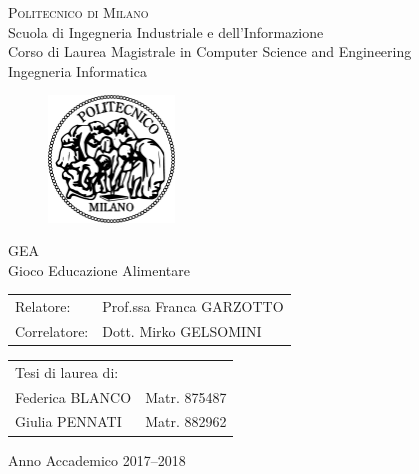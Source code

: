 \begin{titlepage}

\begin{center}
\Large{\textsc{Politecnico di Milano}}\\
\Large{Scuola di Ingegneria Industriale e dell'Informazione}\\
\large{Corso di Laurea Magistrale in Computer Science and Engineering}\\
\large{Ingegneria Informatica}
\par\end{center}

\vspace{0.5cm}

\begin{center}
\begin{figure}[h]
\centering{}\includegraphics[width=0.3\textwidth]{title-page/logo-polimi}
\end{figure}
\vspace{1cm}
\par\end{center}

\begin{center}
\LARGE{GEA\\
Gioco Educazione Alimentare}\vspace{2cm}
\par\end{center}

\begin{flushleft}
\begin{tabular}{ll}
Relatore:  & Prof.ssa Franca GARZOTTO\tabularnewline
Correlatore:  & Dott. Mirko GELSOMINI\tabularnewline
\end{tabular}\vspace{1cm}
\par\end{flushleft}

\begin{flushright}
\begin{tabular}{ll}
Tesi di laurea di: & \tabularnewline
Federica BLANCO & Matr. 875487\tabularnewline
Giulia PENNATI & Matr. 882962\tabularnewline
\end{tabular}\vspace{4cm}
\par\end{flushright}

\begin{center}
{\large{}Anno Accademico 2017--2018}{\large\par}
\par\end{center}

\end{titlepage}
